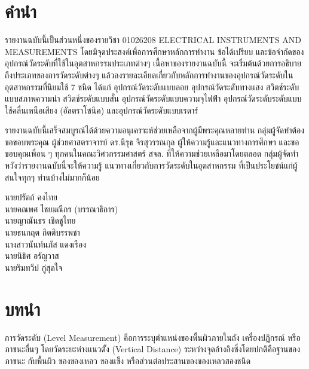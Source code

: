 \documentclass[final,11pt,a4paper]{article}
\begin{document}
\section*{คำนำ}
รายงานฉบับนี้เป็นส่วนหนึ่งของรายวิชา 01026208 ELECTRICAL INSTRUMENTS AND MEASUREMENTS 
โดยมีจุดประสงค์เพื่อการศึกษาหลักการทำงาน ข้อได้เปรียบ และข้อจำกัดของอุปกรณ์วัดระดับที่ใช้ในอุตสาหกรรมประเภทต่างๆ 
เนื้อหาของรายงานฉบับนี้ จะเริ่มต้นด้วยการอธิบายถึงประเภทของการวัดระดับต่างๆ แล้วลงรายละเอียดเกี่ยวกับหลักการทำงานของอุปกรณ์วัดระดับในอุตสาหกรรมที่นิยมใช้
7 ชนิด ได้แก่ อุปกรณ์วัดระดับแบบลอย อุปกรณ์วัดระดับทางแสง สวิตช์ระดับแบบสภาพความนำ สวิตช์ระดับแบบสั่น อุปกรณ์วัดระดับแบบความจุไฟฟ้า 
อุปกรณ์วัดระดับระดับแบบใช้คลื่นเหนือเสียง (อัลตราโซนิค) และอุปกรณ์วัดระดับแบบเรดาร์

รายงานฉบับนี้เสร็จสมบูรณ์ได้ด้วยความอนุเคราะห์ช่วยเหลือจากผู้มีพระคุณหลายท่าน กลุ่มผู้จัดทำต้องขอขอบพระคุณ 
ผู้ช่วยศาสตราจารย์ ดร.นิรุธ จิรสุวรรณกุล ผู้ให้ความรู้และแนวทางการศึกษา และขอขอบคุณเพื่อน ๆ ทุกคนในคณะวิศวกรรมศาสตร์ สจล. ที่ให้ความช่วยเหลือมาโดยตลอด 
กลุ่มผู้จัดทำหวังว่ารายงานฉบับนี้จะให้ความรู้ แนวทางเกี่ยวกับการวัดระดับในอุตสาหกรรม ที่เป็นประโยชน์แก่ผู้สนใจทุกๆ ท่านบ้างไม่มากก็น้อย 

\vspace{1cm}
\hspace{9cm}
\vbox{\noindent
    นายปรัตถ์ คงไทย\\
    นายคณพศ ไชยมณีกร (บรรณาธิการ)\\
    นายญาณันธร เชิดชูไทย\\
    นายธนกฤต กิตติบรรพชา\\
    นางสาวนันท์นภัส แดงเรือง\\
    นายนิธิศ อรัญวาส\\
    นายริมทวีป กู่สุดใจ\\

}
\newpage
\renewcommand\contentsname{สารบัญ}
\tableofcontents
\newpage
\section{บทนำ}
การวัดระดับ (Level Measurement) คือการระบุตำแหน่งของพื้นผิวภายในถัง เครื่องปฏิกรณ์
หรือภาชนะอื่นๆ โดยวัดระยะห่างแนวตั้ง (Vertical Distance) ระหว่างจุดอ้างอิงซึ่งโดยปกติคือฐานของภาชนะ กับพื้นผิว
ของของเหลว ของแข็ง หรือส่วนต่อประสานของของเหลวสองชนิด
\end{document}
